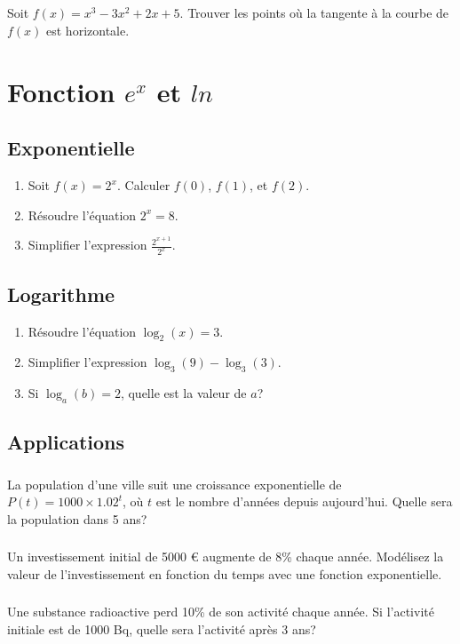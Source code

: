 \documentclass[12pt,a4paper,fleqn]{article}
\begin{document}
\subsection{}
Soit \(f(x) = x^3 - 3x^2 + 2x + 5\). Trouver les points où la tangente à la courbe de \(f(x)\) est horizontale.
\section{Fonction $e^x$ et $ln$}
\subsection{Exponentielle}
\begin{enumerate} 
\item  Soit \(f(x) = 2^x\). Calculer \(f(0)\), \(f(1)\), et \(f(2)\).
\item  Résoudre l'équation \(2^x = 8\).
\item  Simplifier l'expression \(\frac{2^{x+1}}{2^x}\).
\end{enumerate}
\subsection{Logarithme}
\begin{enumerate}
\item Résoudre l'équation \(\log_2(x) = 3\).
\item Simplifier l'expression \(\log_3(9) - \log_3(3)\).
\item Si \(\log_a(b) = 2\), quelle est la valeur de \(a\)?
\end{enumerate}
\subsection{Applications}
\subsubsection{} 
La population d'une ville suit une croissance exponentielle de \(P(t) = 1000 \times 1.02^t\), où \(t\) est le nombre d'années depuis aujourd'hui. Quelle sera la population dans 5 ans?
\subsubsection{} Un investissement initial de 5000 € augmente de 8\% chaque année. Modélisez la valeur de l'investissement en fonction du temps avec une fonction exponentielle.
\subsubsection{} Une substance radioactive perd 10\% de son activité chaque année. Si l'activité initiale est de 1000 Bq, quelle sera l'activité après 3 ans?
\end{document}

